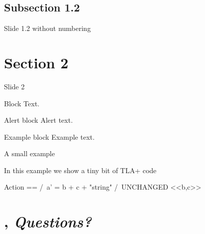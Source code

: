 \documentclass{beamer}
\begin{document}
    \subsection{Subsection 1.2}
    \begin{frame}[nonumber]{Slide 1.2 without numbering}
        \lipsum[2]
    \end{frame}

    \section{Section 2}
    \begin{frame}{Slide 2}
        \begin{block}{Block}
            Text.
        \end{block}
        \pause
        \begin{alertblock}{Alert block}
            Alert \alert{text}.
        \end{alertblock}
        \pause
        \begin{exampleblock}{Example block}
            Example \textcolor{greenPolimi}{text}.
        \end{exampleblock}
    \end{frame}

    \begin{frame}[fragile]{A small example}
        \begin{minipage}{\textwidth}
            In this example we show a tiny bit of TLA+ code
            \begin{tla}
                Action == /\ a' = b + c + "string"
                          /\ UNCHANGED <<b,c>>
            \end{tla}
            \begin{tlatex}
            \end{tlatex}
        \end{minipage}
    \end{frame}

    

    

    

    \section[image=bgphoto_cut]{\Circle, \emph{Questions?}}
    \begin{frame}{}
        \sectionpage
    \end{frame}
\end{document}
